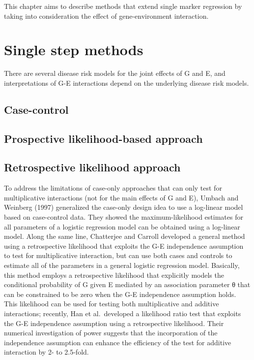 \documentclass[
]{book}
\begin{document}
This chapter aims to describe methods that extend single marker regression by taking into consideration the effect of gene-environment interaction.

\hypertarget{single-step-methods}{%
\section{Single step methods}\label{single-step-methods}}

There are several disease risk models for the joint effects of G and E, and interpretations of G-E interactions depend on the underlying disease risk models.

\hypertarget{case-control}{%
\subsection{Case-control}\label{case-control}}

\hypertarget{prospective-likelihood-based-approach}{%
\subsection{Prospective likelihood-based approach}\label{prospective-likelihood-based-approach}}

\hypertarget{retrospective-likelihood-approach}{%
\subsection{Retrospective likelihood approach}\label{retrospective-likelihood-approach}}

To address the limitations of case-only approaches that can only test for multiplicative interactions (not for the main effects of G and E), Umbach and Weinberg (1997) generalized the case-only design idea to use a log-linear model based on case-control data. They showed the maximum-likelihood estimates for all parameters of a logistic regression model can be obtained using a log-linear model. Along the same line, Chatterjee and Carroll developed a general method using a retrospective likelihood that exploits the G-E independence assumption to test for multiplicative interaction, but can use both cases and controls to estimate all of the parameters in a general logistic regression model. Basically, this method employs a retrospective likelihood that explicitly models the conditional probability of G given E mediated by an association parameter θ that can be constrained to be zero when the G-E independence assumption holds. This likelihood can be used for testing both multiplicative and additive interactions; recently, Han et al.~developed a likelihood ratio test that exploits the G-E independence assumption using a retrospective likelihood. Their numerical investigation of power suggests that the incorporation of the independence assumption can enhance the efficiency of the test for additive interaction by 2- to 2.5-fold.
\end{document}
